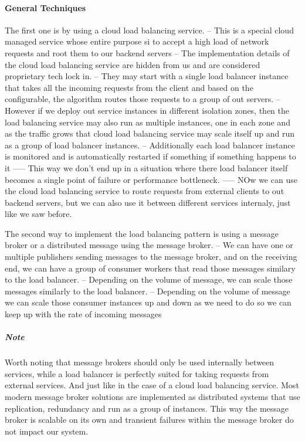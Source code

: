 \documentclass[a4paper, 11pt]{book}
\begin{document}
    \paragraph{General Techniques}
    The first one is by using a cloud load balancing service.
    -- This is a special cloud managed service whose entire purpose si to accept a high load of network requests and root them to our backend servers
    -- The implementation details of the cloud load balancing service are hidden from us and are considered proprietary tech lock in.
    -- They may start with a single load balancer instance that takes all the incoming requests from the client and based on the configurable, the algorithm routes those requests to a group of out servers.
    -- However if we deploy out service instances in different isolation zones, then the load balancing service may also run as multiple instances, one in each zone and as the traffic grows that cloud load balancing service may scale itself up and run as a group of load balancer instances.
    -- Additionally each load balancer instance is monitored and is automatically restarted if something if something happens to it
    ----- This way we don't end up in a situation where there load balancer itself becomes a single point of failure or performance bottleneck.
    ----- NOw we can use the cloud load balancing service to route requests from external clients to out backend servers, but we can also use it between different services internaly, just like we saw before.

    The second way to implement the load balancing pattern is using a message broker or a distributed message using the message broker.
    -- We can have one or multiple publishers sending messages to the message broker, and on the receiving end, we can have a group of consumer workers that read those messages similary to the load balancer.
    -- Depending on the volume of message, we can scale those messages similarly to the load balancer.
    -- Depending on the volume of message we can scale those consumer instances up and down as we need to do so we can keep up with the rate of incoming messages

    \subparagraph{Note} Worth noting that message brokers should only be used internally between services, while a load balancer is perfectly suited for taking requests from external services.
    And just like in the case of a cloud load balancing service.
    Most modern message broker solutions are implemented as distributed systems that use replication, redundancy and run as a group of instances.
    This way the message broker is scalable on its own and transient failures within the message broker do not impact our system.
\end{document}
